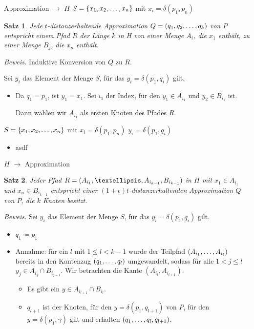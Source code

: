 \documentclass{beamer}
\newtheorem{thm}{Satz}
\begin{document}
	\begin{frame}[t]{Approximation $\rightarrow$ $H$}
		$S = \{x_1, x_2, \mathellipsis, x_n\}$ mit $x_i = \delta(p_1, p_n)$
		\begin{thm}
			Jede $t$-distanzerhaltende Approximation $Q = (q_1, q_2, \mathellipsis, q_k)$ von $P$ entspricht einem Pfad $R$ der Länge $k$ in H von einer Menge $A_i$, die $x_1$ enthält, zu einer Menge $B_j$, die $x_n$ enthält.
		\end{thm}
		\textit{Beweis.} Induktive Konversion von $Q$ zu $R$.
		
		Sei $y_i$ das Element der Menge $S$, für das $y_i = \delta(p_1, q_i)$ gilt. 
		\begin{itemize}
			\item Da $q_1 = p_1$, ist $y_1 = x_1$.
			Sei $i_1$ der Index, für den $y_1 \in A_{i_1}$ und $y_2 \in B_{i_1}$ ist. 
			
			Dann wählen wir $A_{i_1}$ als ersten Knoten des Pfades $R$.
		\end{itemize}
	\end{frame}
	
	\begin{frame}
		$S = \{x_1, x_2, \mathellipsis, x_n\}$ mit $x_i = \delta(p_1, p_n)$
		$y_i = \delta(p_1, q_i)$ 
		
		\begin{itemize}
			\item asdf
		\end{itemize}
	
	\end{frame}
	
	\begin{frame}{$H$ $\rightarrow$ Approximation}
		\begin{thm}
			Jeder Pfad $R = (A_{i_1}, \textellipsis, A_{i_{k-1}}, B_{i_{k-1}})$ in $H$ mit $x_1 \in A_{i_1}$ und $x_n \in B_{i_{k-1}}$ entspricht einer $(1+\epsilon)t$-distanzerhaltenden Approximation $Q$ von $P$, die $k$ Knoten besitzt.
		\end{thm}
		\textit{Beweis.}
		Sei $y_i$ das Element der Menge $S$, für das $y_i = \delta(p_1, q_i)$ gilt.
		\begin{itemize}
			\item $q_1 \coloneqq p_1$
			\item Annahme: für ein $l$ mit $1 \leq l < k-1$ wurde der Teilpfad $(A_{i_1}, \mathellipsis, A_{i_l})$ bereits in den Kantenzug $(q_1, \mathellipsis, q_l)$ umgewandelt, sodass für alle $1 < j \leq l$ $y_j \in A_{i_j} \cap B_{i_{j-1}}$.  
			Wir betrachten die Kante $(A_{i_l}, A_{i_{l+1}})$.
			\begin{itemize}
				\item Es gibt ein $y \in A_{i_{l+1}} \cap B_{i_l}$.
				\item $q_{l+1}$ ist der Knoten, für den $y = \delta(p_1, q_{l+1})$ von $P$, für den $y = \delta(p_1, \gamma)$ gilt und erhalten $(q_1, \mathellipsis, q_l, q_{l+1})$.
			\end{itemize}
		\end{itemize}
	\end{frame}
	
\end{document}
